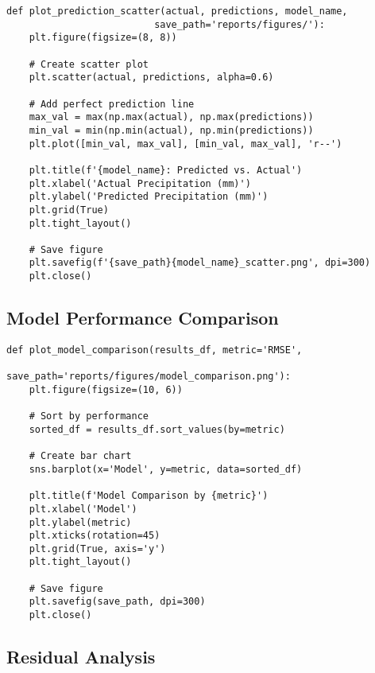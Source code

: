 \documentclass[12pt]{article}
\begin{document}
\begin{verbatim}
def plot_prediction_scatter(actual, predictions, model_name, 
                          save_path='reports/figures/'):
    plt.figure(figsize=(8, 8))
    
    # Create scatter plot
    plt.scatter(actual, predictions, alpha=0.6)
    
    # Add perfect prediction line
    max_val = max(np.max(actual), np.max(predictions))
    min_val = min(np.min(actual), np.min(predictions))
    plt.plot([min_val, max_val], [min_val, max_val], 'r--')
    
    plt.title(f'{model_name}: Predicted vs. Actual')
    plt.xlabel('Actual Precipitation (mm)')
    plt.ylabel('Predicted Precipitation (mm)')
    plt.grid(True)
    plt.tight_layout()
    
    # Save figure
    plt.savefig(f'{save_path}{model_name}_scatter.png', dpi=300)
    plt.close()
\end{verbatim}

\subsection{Model Performance Comparison}
\label{subsec:performance_comparison}

\begin{verbatim}
def plot_model_comparison(results_df, metric='RMSE', 
                        save_path='reports/figures/model_comparison.png'):
    plt.figure(figsize=(10, 6))
    
    # Sort by performance
    sorted_df = results_df.sort_values(by=metric)
    
    # Create bar chart
    sns.barplot(x='Model', y=metric, data=sorted_df)
    
    plt.title(f'Model Comparison by {metric}')
    plt.xlabel('Model')
    plt.ylabel(metric)
    plt.xticks(rotation=45)
    plt.grid(True, axis='y')
    plt.tight_layout()
    
    # Save figure
    plt.savefig(save_path, dpi=300)
    plt.close()
\end{verbatim}

\subsection{Residual Analysis}
\label{subsec:residual_analysis}
\end{document}
